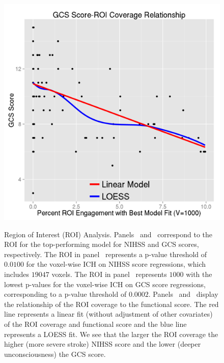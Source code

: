 \documentclass[10pt]{article}\usepackage[]{graphicx}\usepackage[]{color}
\begin{document}
\begin{figure}[htbp]
{ \label{pvals:reggcs}
 \includegraphics[width=.48\textwidth]{Regress_ROI_GCS_Best_Model.png}
 } 
 \newline 
  
  \caption{Region of Interest (ROI) Analysis.  Panels~\protect{} and~\protect{} correspond to the ROI for the top-performing model for NIHSS and GCS scores, respectively.  The ROI in panel~\protect{} represents a p-value threshold of $0.0100$ for the voxel-wise ICH on NIHSS score regressions, which includes $19047$ voxels. The ROI in panel~\protect{} represents $1000$ with the lowest p-values for the voxel-wise ICH on GCS score regressions, corresponding to a p-value threshold of $0.0002$.
    Panels~\protect{} and~\protect{} display the relationship of the ROI coverage to the functional score.  The red line represents a linear fit (without adjustment of other covariates) of the ROI coverage and functional score and the blue line represents a LOESS fit.  We see that the larger the ROI coverage the higher (more severe stroke) NIHSS score and the lower (deeper unconsciousness) the GCS score.  
}
  \label{f:roi}
\end{figure}





  
\end{document}
